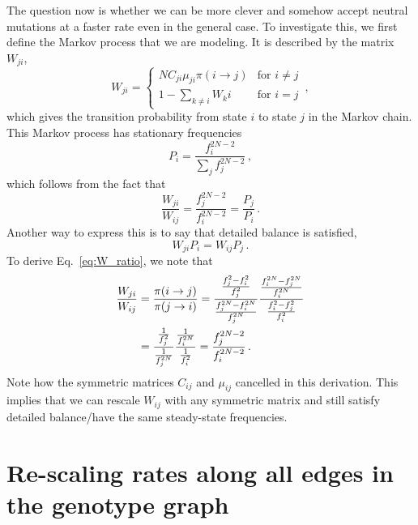 \documentclass[12pt]{article}
\begin{document}
The question now is whether we can be more clever and somehow accept neutral mutations at a faster rate even in the general case. To investigate this, we first define the Markov process that we are modeling. It is described by the matrix $W_{ji}$,
\begin{equation}
   W_{ji} = 
        \begin{cases}
            N C_{ji}\mu_{ji}\pi(i\rightarrow j) & \text{for $i\neq j$} \\
            1 - \sum_{k\neq i} W_ki & \text{for $i=j$}
        \end{cases}\,,
\end{equation}
which gives the transition probability from state $i$ to state $j$ in the Markov chain. This Markov process has stationary frequencies
\begin{equation}
  P_i = \frac{f_i^{2N-2}}{\sum_j f_j^{2N-2}}\,,
\end{equation}
which follows from the fact that
\begin{equation}\label{eq:W_ratio}
  \frac{W_{ji}}{W_{ij}} = \frac{f_j^{2N-2}}{f_i^{2N-2}} = \frac{P_j}{P_i}\,.
\end{equation}
Another way to express this is to say that detailed balance is satisfied,
\begin{equation}
  W_{ji}P_i = W_{ij}P_j\,.
\end{equation}
To derive Eq.~\eqref{eq:W_ratio}, we note that
\begin{align}\label{eq:W_ratio_explicit}
  \frac{W_{ji}}{W_{ij}} &= \frac{\pi(i\rightarrow j)}{\pi(j\rightarrow i)}
  = \frac{\frac{f_j^2-f_i^2}{f_j^2}}{\frac{f_j^{2N}-f_i^{2N}}{f_j^{2N}}} 
    \frac{\frac{f_i^{2N}-f_j^{2N}}{f_i^{2N}}}{\frac{f_i^2-f_j^2}{f_i^2}}\notag \\
  &= \frac{\frac{1}{f_j^2}}{\frac{1}{f_j^{2N}}} 
    \frac{\frac{1}{f_i^{2N}}}{\frac{1}{f_i^2}} = \frac{f_j^{2N-2}}{f_i^{2N-2}}\,.
\end{align}
Note how the symmetric matrices $C_{ij}$ and $\mu_{ij}$ cancelled in this derivation. This implies that we can rescale $W_{ij}$ with any symmetric matrix and still satisfy detailed balance/have the same steady-state frequencies.

\section{Re-scaling rates along all edges in the genotype graph}
\end{document}
